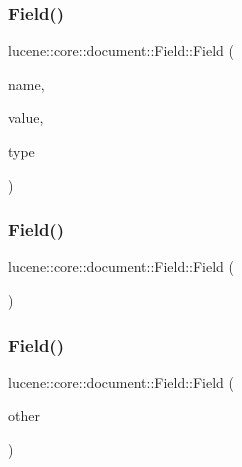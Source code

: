 \subsubsection{\texorpdfstring{Field()}{Field()}\hspace{0.1cm}{\footnotesize\ttfamily [9/11]}}
{\footnotesize\ttfamily lucene\+::core\+::document\+::\+Field\+::\+Field (\begin{DoxyParamCaption}\item[{const std\+::string \&}]{name,  }\item[{std\+::string \&\&}]{value,  }\item[{const \mbox{\hyperlink{classlucene_1_1core_1_1document_1_1FieldType}{Field\+Type}} \&}]{type }\end{DoxyParamCaption})\hspace{0.3cm}{\ttfamily [inline]}}

\mbox{\label{classlucene_1_1core_1_1document_1_1Field_a9759aeef777d122b3a14ea237b9996df}} 
\subsubsection{\texorpdfstring{Field()}{Field()}\hspace{0.1cm}{\footnotesize\ttfamily [10/11]}}
{\footnotesize\ttfamily lucene\+::core\+::document\+::\+Field\+::\+Field (\begin{DoxyParamCaption}\item[{const \mbox{\hyperlink{classlucene_1_1core_1_1document_1_1Field}{Field}} \&}]{ }\end{DoxyParamCaption})\hspace{0.3cm}{\ttfamily [delete]}}

\mbox{\label{classlucene_1_1core_1_1document_1_1Field_a84c8c8edfd1576cdc1adcf6f3c38b57f}} 
\subsubsection{\texorpdfstring{Field()}{Field()}\hspace{0.1cm}{\footnotesize\ttfamily [11/11]}}
{\footnotesize\ttfamily lucene\+::core\+::document\+::\+Field\+::\+Field (\begin{DoxyParamCaption}\item[{\mbox{\hyperlink{classlucene_1_1core_1_1document_1_1Field}{Field}} \&\&}]{other }\end{DoxyParamCaption})\hspace{0.3cm}{\ttfamily [inline]}}

